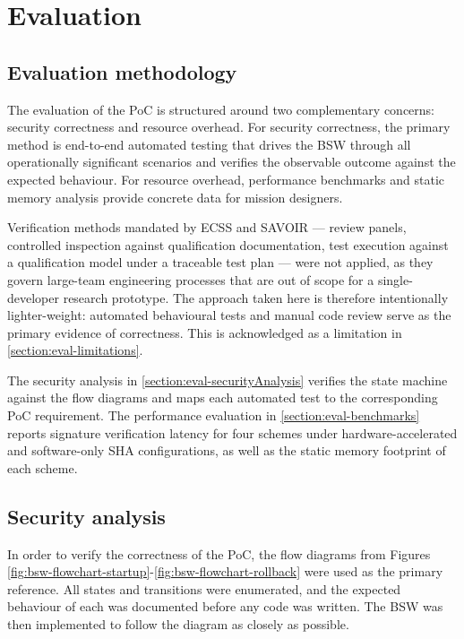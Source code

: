 \chapter{Evaluation}
\label{chapter:eval}

\section{Evaluation methodology}
\label{section:eval-methodology}

The evaluation of the PoC is structured around two complementary concerns: security correctness and resource overhead. For security correctness, the primary method is end-to-end automated testing that drives the BSW through all operationally significant scenarios and verifies the observable outcome against the expected behaviour. For resource overhead, performance benchmarks and static memory analysis provide concrete data for mission designers.

Verification methods mandated by ECSS and SAVOIR — review panels, controlled inspection against qualification documentation, test execution against a qualification model under a traceable test plan — were not applied, as they govern large-team engineering processes that are out of scope for a single-developer research prototype. The approach taken here is therefore intentionally lighter-weight: automated behavioural tests and manual code review serve as the primary evidence of correctness. This is acknowledged as a limitation in \autoref{section:eval-limitations}.

The security analysis in \autoref{section:eval-securityAnalysis} verifies the state machine against the flow diagrams and maps each automated test to the corresponding PoC requirement. The performance evaluation in \autoref{section:eval-benchmarks} reports signature verification latency for four schemes under hardware-accelerated and software-only SHA configurations, as well as the static memory footprint of each scheme.


\section{Security analysis}
\label{section:eval-securityAnalysis}

In order to verify the correctness of the PoC, the flow diagrams from Figures \ref{fig:bsw-flowchart-startup}-\ref{fig:bsw-flowchart-rollback} were used as the primary reference. All states and transitions were enumerated, and the expected behaviour of each was documented before any code was written. The BSW was then implemented to follow the diagram as closely as possible.

